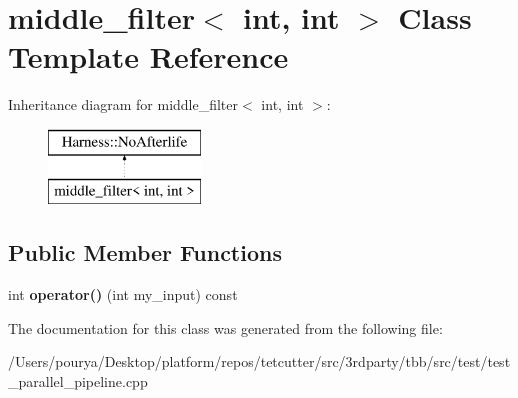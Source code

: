 \hypertarget{classmiddle__filter_3_01int_00_01int_01_4}{}\section{middle\+\_\+filter$<$ int, int $>$ Class Template Reference}
\label{classmiddle__filter_3_01int_00_01int_01_4}
Inheritance diagram for middle\+\_\+filter$<$ int, int $>$\+:\begin{figure}[H]
\begin{center}
\leavevmode
\includegraphics[height=2.000000cm]{classmiddle__filter_3_01int_00_01int_01_4}
\end{center}
\end{figure}
\subsection*{Public Member Functions}
\begin{DoxyCompactItemize}
\item 
\hypertarget{classmiddle__filter_3_01int_00_01int_01_4_a7205de5b0ba8376c56b6ae5c71e4c708}{}int {\bfseries operator()} (int my\+\_\+input) const \label{classmiddle__filter_3_01int_00_01int_01_4_a7205de5b0ba8376c56b6ae5c71e4c708}

\end{DoxyCompactItemize}


The documentation for this class was generated from the following file\+:\begin{DoxyCompactItemize}
\item 
/\+Users/pourya/\+Desktop/platform/repos/tetcutter/src/3rdparty/tbb/src/test/test\+\_\+parallel\+\_\+pipeline.\+cpp\end{DoxyCompactItemize}
